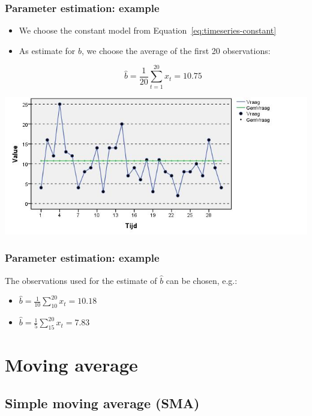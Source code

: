 \documentclass{beamer}
\begin{document}
\begin{frame}
  \frametitle{Parameter estimation: example}

  \begin{itemize}
    \item We choose the constant model from Equation~\ref{eq:timeseries-constant}
    \item As estimate for $b$, we choose the average of the first 20 observations:

      \[ \widehat{b} = \frac{1}{20} \sum_{t = 1}^{20} x_{t}= 10.75 \]

  \end{itemize}

  \centering
  \includegraphics[width=.7\textwidth]{img/tijdreeks21.jpg}
\end{frame}

\begin{frame}
  \frametitle{Parameter estimation: example}

  The observations used for the estimate of $\widehat{b}$ can be chosen, e.g.:

  \begin{itemize}
    \item $\widehat{b} = \frac{1}{10} \sum_{10}^{20} x_{t} = 10.18$
    \item $\widehat{b} = \frac{1}{5} \sum_{15}^{20} x_{t} = 7.83$
  \end{itemize}

\end{frame}

\section{Moving average}

\subsection{Simple moving average (SMA)}
\end{document}

